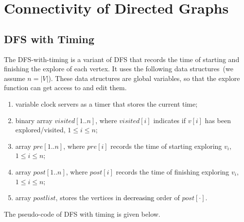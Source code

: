 \setcounter{definition}{0} \setcounter{property}{0} \setcounter{claim}{0} \setcounter{fact}{0} \setcounter{corollary}{0} \setcounter{figure}{0}

\section{Connectivity of Directed Graphs}

\subsection*{DFS with Timing}

The DFS-with-timing is a variant of DFS that records the time of starting and finishing the explore
of each vertex. It uses the following data structures~(we assume $n = |V|$).
These data structures are global variables, so that the explore function
can get access to and edit them.

\begin{enumerate}
\item variable clock servers as a timer that stores the current time;
\item binary array $visited[1..n]$, where $visited[i]$ indicates if $v[i]$ has been explored/visited, $1 \le i \le n$;
\item array $pre[1..n]$, where $pre[i]$ records the time of starting exploring $v_i$, $1 \le i \le n$;
\item array $post[1..n]$, where $post[i]$ records the time of finishing exploring $v_i$, $1 \le i \le n$;
\item array $postlist$, stores the vertices in \textcolor{black}{decreasing} order of $post[\cdot]$.
\end{enumerate}

The pseudo-code of DFS with timing is given below.

\begin{algorithmblock}[0.8\textwidth]
	\xxx
	\xxx
	\xxx
	\xxx
	\xxx
	\xxx
\end{algorithmblock}

\begin{algorithmblock}[0.8\textwidth]
	\xxx
	\xxx
	\xxx
	\xxx
	\xxx
	\xxx
	\xxx
	\xxx
	\xxx
\end{algorithmblock}

